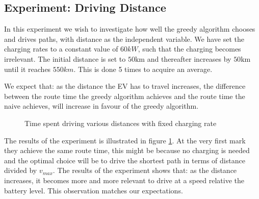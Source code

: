 \subsection{Experiment: Driving Distance}
In this experiment we wish to investigate how well the greedy algorithm chooses and drives paths, with distance as the independent variable. We have set the charging rates to a constant value of $60 \si{kW}$, such that the charging becomes irrelevant. The initial distance is set to $50 \si{\km}$ and thereafter increases by $50 \si{\km}$ until it reaches $550 \si{km}$. This is done 5 times to acquire an average.

We expect that: as the distance the EV has to travel increases, the difference between the route time the greedy algorithm achieves and the route time the naive achieves, will increase in favour of the greedy algorithm. 

\begin{figure}[!htb]
\centering
{}
\caption{Time spent driving various distances with fixed charging rate} 
\label{fig:driving_dist}
\end{figure}

The results of the experiment is illustrated in figure \ref{fig:driving_dist}. At the very first mark they achieve the same route time, this might be because no charging is needed and the optimal choice will be to drive the shortest path in terms of distance divided by $v_{max}$. The results of the experiment shows that: as the distance increases, it becomes more and more relevant to drive at a speed relative the battery level. This observation matches our expectations.
